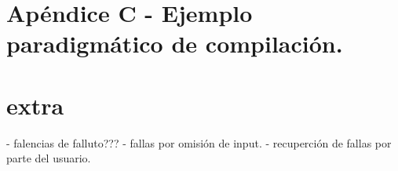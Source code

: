 \documentclass[titlepage, 12pt]{book}
\begin{document}
\chapter{Ap\'endice C - Ejemplo paradigm\'atico de compilaci\'on.}




\chapter{extra}
	- falencias de falluto??? 
	- fallas por omisi\'on de input.
	- recuperci\'on de fallas por parte del usuario.




%
%
%
%
%
%
%
%
%
%
\end{document}
